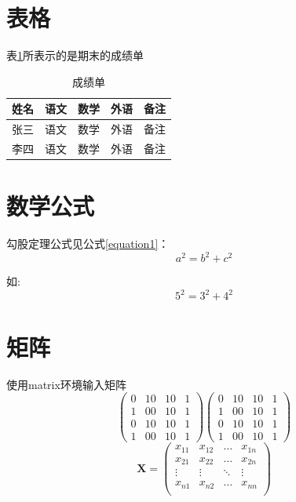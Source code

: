 \documentclass[10]{article}
\begin{document}
	\section{表格}
	表\ref{table-score}所表示的是期末的成绩单
	\begin{table}[h]
	\centering
	\caption{成绩单}\label{table-score}
		\begin{tabular}{|l| c| c| c|p{1.5cm} |}
			\hline
			姓名 & 语文 & 数学 & 外语 & 备注 \\
			\hline
			张三 & 语文 & 数学 & 外语 & 备注 \\
			\hline
			李四 & 语文 & 数学 & 外语 & 备注 \\
			\hline
		\end{tabular}
	\end{table}

	\section{数学公式}
	勾股定理公式见公式\ref{equation1}：
	\begin{equation}
		a^{2}=b^{2}+c^{2}\label{equation1}
	\end{equation}
	
	如:
	\begin{equation}
	5^{2}=3^{2}+4^{2}\label{equation2}
	\end{equation}
	
	\section{矩阵}
	使用matrix环境输入矩阵
	$$\begin{pmatrix}
		0 & 10 & 10 & 1\\
		1 & 00 & 10 & 1\\
		0 & 10 & 10 & 1\\
		1 & 00 & 10 & 1
	\end{pmatrix}
	\begin{pmatrix}
	0 & 10 & 10 & 1\\
	1 & 00 & 10 & 1\\
	0 & 10 & 10 & 1\\
	1 & 00 & 10 & 1
	\end{pmatrix}$$
	\[ \mathbf{X} = \left( \begin{array}{cccc} x_{11} & x_{12} & \ldots & x_{1n}\\ x_{21} & x_{22} & \ldots & x_{2n}\\ \vdots & \vdots & \ddots & \vdots\\ x_{n1} & x_{n2} & \ldots & x_{nn}\\ \end{array} \right) \]
	
\end{document}
